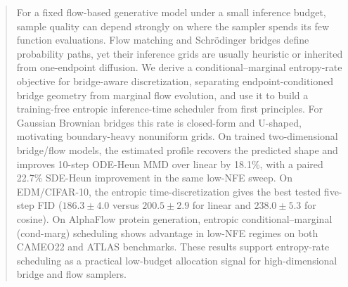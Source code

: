 \documentclass{article}
\theoremstyle{plain}
\theoremstyle{definition}
\theoremstyle{remark}
\begin{document}
\begin{abstract}
    For a fixed flow-based generative model under a small inference budget, sample quality can depend strongly on where the sampler spends its few function evaluations. Flow matching and Schr\"odinger bridges define probability paths, yet their inference grids are usually heuristic or inherited from one-endpoint diffusion. We derive a conditional--marginal entropy-rate objective for bridge-aware discretization, separating endpoint-conditioned bridge geometry from marginal flow evolution, and use it to build a training-free entropic inference-time scheduler from first principles. For Gaussian Brownian bridges this rate is closed-form and U-shaped, motivating boundary-heavy nonuniform grids. On trained two-dimensional bridge/flow models, the estimated profile recovers the predicted shape and improves 10-step ODE-Heun MMD over linear by 18.1\%, with a paired 22.7\% SDE-Heun improvement in the same low-NFE sweep. On EDM/CIFAR-10, the entropic time-discretization gives the best tested five-step FID ($186.3\pm4.0$ versus $200.5\pm2.9$ for linear and $238.0\pm5.3$ for cosine). On AlphaFlow protein generation, entropic conditional--marginal (cond-marg) scheduling shows advantage in low-NFE regimes on both CAMEO22 and ATLAS benchmarks. These results support entropy-rate scheduling as a practical low-budget allocation signal for high-dimensional bridge and flow samplers.




\end{abstract}
\end{document}
